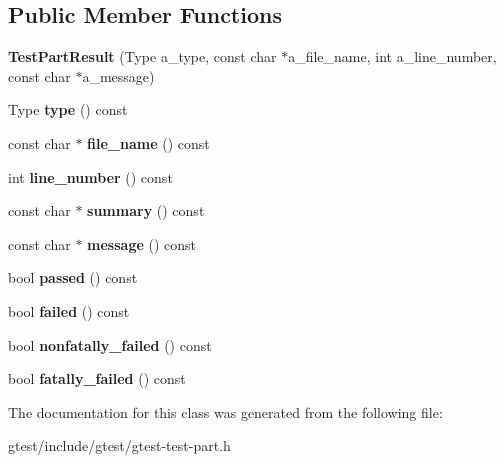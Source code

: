 \subsection*{Public Member Functions}
\begin{DoxyCompactItemize}
\item 
\mbox{\label{classtesting_1_1TestPartResult_a6409eb519c1cd514aab2426c8f40737f}} 
{\bfseries Test\+Part\+Result} (Type a\+\_\+type, const char $\ast$a\+\_\+file\+\_\+name, int a\+\_\+line\+\_\+number, const char $\ast$a\+\_\+message)
\item 
\mbox{\label{classtesting_1_1TestPartResult_aab92b225e8a472e78bd3889ca6df0d2a}} 
Type {\bfseries type} () const
\item 
\mbox{\label{classtesting_1_1TestPartResult_a0be40512f50a0086c4d3dc43938978aa}} 
const char $\ast$ {\bfseries file\+\_\+name} () const
\item 
\mbox{\label{classtesting_1_1TestPartResult_ad4c5da5f13245ac18cf256d0d9f3eda9}} 
int {\bfseries line\+\_\+number} () const
\item 
\mbox{\label{classtesting_1_1TestPartResult_a655ab538e510434ba557ad66c35aa42c}} 
const char $\ast$ {\bfseries summary} () const
\item 
\mbox{\label{classtesting_1_1TestPartResult_a5019dc9d753aba5949777270de255d49}} 
const char $\ast$ {\bfseries message} () const
\item 
\mbox{\label{classtesting_1_1TestPartResult_ac90edd5ea9cc4bb986a1eb2b5e1d53de}} 
bool {\bfseries passed} () const
\item 
\mbox{\label{classtesting_1_1TestPartResult_aa04b377c3e7ed57d39e882df5561ac90}} 
bool {\bfseries failed} () const
\item 
\mbox{\label{classtesting_1_1TestPartResult_a6197c7f6672acc1cfdf580eb1f2183ac}} 
bool {\bfseries nonfatally\+\_\+failed} () const
\item 
\mbox{\label{classtesting_1_1TestPartResult_a77db157eff9531c3c00c2420502f9a89}} 
bool {\bfseries fatally\+\_\+failed} () const
\end{DoxyCompactItemize}


The documentation for this class was generated from the following file\+:\begin{DoxyCompactItemize}
\item 
gtest/include/gtest/gtest-\/test-\/part.\+h\end{DoxyCompactItemize}
